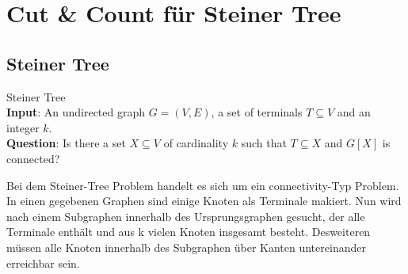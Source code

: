 %
%
%
\chapter{Cut \& Count für Steiner Tree}
\label{c:cc_steiner}

\section{Steiner Tree}
\label{sec:steiner}
\begin{definition}
Steiner Tree\\
\textbf{Input}: An undirected graph $G = (V, E)$, a set of terminals $T \subseteq V$ and an integer $k$. \\
\textbf{Question}: Is there a set $X \subseteq V$ of cardinality $k$ such that $T \subseteq X$ and $G[X]$ is connected?
\end{definition}

Bei dem Steiner-Tree Problem handelt es sich um ein connectivity-Typ Problem. In einen gegebenen Graphen sind einige Knoten als Terminale makiert. Nun wird nach einem Subgraphen innerhalb des Ursprungsgraphen gesucht, der alle Terminale enthält und aus k vielen Knoten insgesamt besteht. Desweiteren müssen alle Knoten innerhalb des Subgraphen über Kanten untereinander erreichbar sein.

